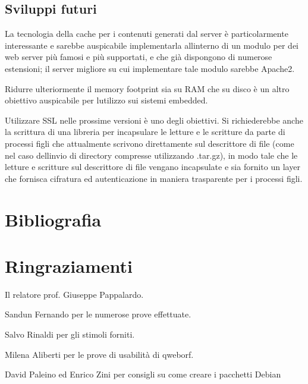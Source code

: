 \documentclass[a4paper,11pt]{article}
\begin{document}
\subsection{Sviluppi futuri}
{\sffamily
La tecnologia della cache per i contenuti generati dal server \`e
particolarmente interessante e sarebbe auspicabile implementarla
all{\textquotesingle}interno di un modulo per dei web server pi\`u
famosi e pi\`u supportati, e che gi\`a dispongono di numerose
estensioni; il server migliore su cui implementare tale modulo sarebbe
Apache2.}

{\sffamily
Ridurre ulteriormente il memory footprint sia su RAM che su disco \`e un
altro obiettivo auspicabile per l{\textquotesingle}utilizzo sui sistemi
embedded.}

{\sffamily
Utilizzare SSL nelle prossime versioni \`e uno degli obiettivi. Si
richiederebbe anche la scrittura di una libreria per incapsulare le
letture e le scritture da parte di processi figli che attualmente
scrivono direttamente sul descrittore di file (come nel caso
dell{\textquotesingle}invio di directory compresse utilizzando
.tar.gz), in modo tale che le letture e scritture sul descrittore di
file vengano incapsulate e sia fornito un layer che fornisca cifratura
ed autenticazione in maniera trasparente per i processi figli.}

\section{Bibliografia}




\bigskip

\section[Ringraziamenti]{\sffamily Ringraziamenti}
{\sffamily
Il relatore prof. Giuseppe Pappalardo.}

{\sffamily
Sandun Fernando per le numerose prove effettuate.}

{\sffamily
Salvo Rinaldi per gli stimoli forniti.}

{\sffamily
Milena Aliberti per le prove di usabilit\`a di qweborf.}

{\sffamily
David Paleino ed Enrico Zini per consigli su come creare i pacchetti
Debian}
\end{document}
